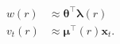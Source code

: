 \documentclass[review,authoryear,3p]{elsarticle}
\newcommand{\dean}[1]{\textcolor{green}{#1}}
\begin{document}
\begin{align}
	w\left(r\right) &\approx \boldsymbol\theta^\top\boldsymbol\lambda\left(r\right) 
	\label{eq:KernelFiniteExpansion} \\
	v_t\left(r\right) &\approx \boldsymbol\mu^\top\left(r\right)\mathbf{x}_t.
	\label{eq:FieldFiniteExpansion}
\end{align}
% 
\end{document}
